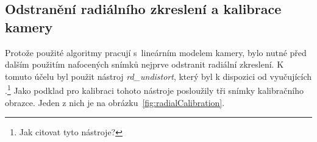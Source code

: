 \documentclass[11pt,oneside,a4paper,pdftex]{article}   %
\begin{document}
	\subsection{Odstranění radiálního zkreslení a kalibrace kamery} Protože použité algoritmy pra\-cují
	s~lineárním modelem kamery, bylo nutné před dalším použitím nafocených snímků nej\-prve odstranit
	radiální zkreslení. K tomuto účelu byl použit nástroj \emph{rd\_undistort}, který byl k dispozici od
	vyučujících \cite{code_repo}.\footnote{Jak citovat tyto nástroje?} Jako podklad pro kalibraci tohoto
	nástroje posloužily tři snímky kalibračního obrazce. Jeden z nich je na obrázku~\ref{fig:radialCalibration}.
	
	\def\IAC{\boldsymbol \omega}
	
\end{document}
